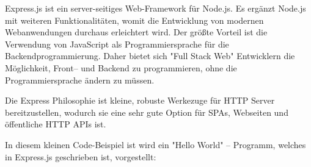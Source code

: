 
Express.js ist ein server-seitiges Web-Framework für Node.js. Es ergänzt Node.js mit weiteren Funktionalitäten, womit die Entwicklung von modernen Webanwendungen durchaus erleichtert wird. Der größte Vorteil ist die Verwendung von JavaScript als Programmiersprache für die Backendprogrammierung. Daher bietet sich "Full Stack Web" Entwicklern die Möglichkeit, Front– und Backend zu programmieren, ohne die Programmiersprache ändern zu müssen. 

Die Express Philosophie ist kleine, robuste Werkezuge für HTTP Server bereitzustellen, wodurch sie eine sehr gute Option für SPAs, Webseiten und öffentliche HTTP APIs ist. \cite{Express}


In diesem kleinen Code-Beispiel ist wird ein "Hello World" – Programm, welches in Express.js geschrieben ist, vorgestellt:

\cite{Express}

